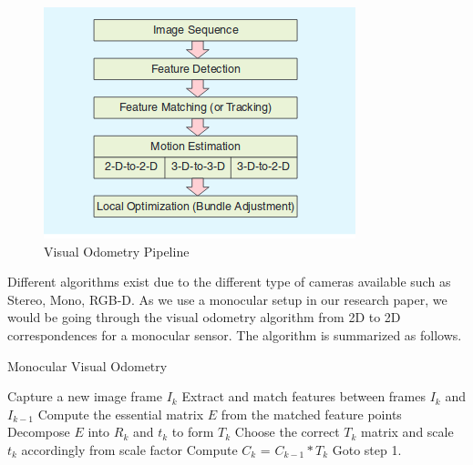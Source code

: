 \begin{figure}[!htb]
  \includegraphics[width=\textwidth]{./figures/vo.png}
\caption{Visual Odometry Pipeline}
\label{fig:vo}       %
\end{figure}

Different algorithms exist due to the different type of cameras available such as Stereo, Mono, RGB-D. As we use a monocular setup in our research paper, we would be going through the visual odometry algorithm from 2D to 2D correspondences for a monocular sensor. The algorithm is summarized as follows.

\begin{algorithm}
    \caption{Monocular Visual Odometry}
	\begin{algorithmic}[1]
		\State Capture a new image frame $I_k$
    	\State Extract and match features between frames $I_k$ and $I_{k-1}$
    	\State Compute the essential matrix $E$ from the matched feature points
    	\State Decompose $E$ into $R_k$ and $t_k$ to form $T_k$
    	\State Choose the correct $T_k$ matrix and scale $t_k$ accordingly from scale factor
    	\State Compute $C_k$ = $C_{k-1}*T_k$
    	\State Goto step 1.
	\end{algorithmic}
\end{algorithm}

